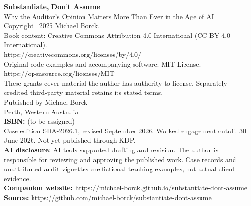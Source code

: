\thispagestyle{empty}
\vspace*{\fill}

\begin{flushleft}
\textbf{Substantiate, Don't Assume}\\
Why the Auditor's Opinion Matters More Than Ever in the Age of AI\\[1.5em]
Copyright \textcopyright\ 2025 Michael Borck.\\[1em]
Book content: Creative Commons Attribution 4.0 International (CC BY 4.0 International).\\
https://creativecommons.org/licenses/by/4.0/\\[0.5em]
Original code examples and accompanying software: MIT License.\\
https://opensource.org/licenses/MIT\\[0.5em]
These grants cover material the author has authority to license. Separately credited third-party material retains its stated terms.\\[1em]
Published by Michael Borck\\
Perth, Western Australia\\[1em]
\textbf{ISBN:} (to be assigned)\\[1em]
Case edition SDA-2026.1, revised September 2026. Worked engagement cutoff: 30 June 2026. Not yet published through KDP.\\[1em]
\textbf{AI disclosure:} AI tools supported drafting and revision. The author is responsible for reviewing and approving the published work. Case records and unattributed audit vignettes are fictional teaching examples, not actual client evidence.\\[1em]
\textbf{Companion website:} https://michael-borck.github.io/substantiate-dont-assume\\
\textbf{Source:} https://github.com/michael-borck/substantiate-dont-assume
\end{flushleft}

\vspace*{\fill}
\clearpage

